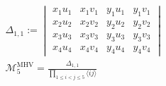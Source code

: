 \documentclass[12pt,border=8pt]{standalone}
\begin{document}
\(\displaystyle
\begin{gathered}
\Delta_{1,1}:=
\begin{vmatrix}
x_1u_1 & x_1v_1 & y_1u_1 & y_1v_1 \\
x_2u_2 & x_2v_2 & y_2u_2 & y_2v_2 \\
x_3u_3 & x_3v_3 & y_3u_3 & y_3v_3 \\
x_4u_4 & x_4v_4 & y_4u_4 & y_4v_4
\end{vmatrix}
\\[18pt]
\mathcal{M}^{\mathrm{MHV}}_5
=\frac{\Delta_{1,1}}{\displaystyle\prod_{1\leq i<j\leq 5}\langle ij\rangle}
\end{gathered}
\)
\end{document}
